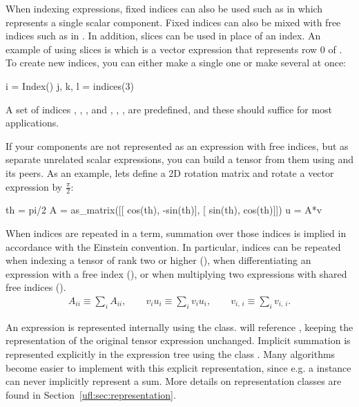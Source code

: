When indexing expressions, fixed indices can also be used such as in
 which represents a single scalar component.  Fixed
indices can also be mixed with free indices such as in .
In addition, slices can be used in place of an index.  An example of
using slices is  which is a vector expression that
represents row 0 of .  To create new indices, you can either
make a single one or make several at once:
\begin{uflcode}
i = Index()
j, k, l = indices(3)
\end{uflcode}
A set of indices , , ,  and
, , ,  are predefined,
and these should suffice for most applications.

If your components are not represented as an expression with free
indices, but as separate unrelated scalar expressions, you can build a
tensor from them using  and its peers.  As an
example, lets define a 2D rotation matrix and rotate a vector
expression by $\frac \pi 2$:
\begin{uflcode}
th = pi/2
A = as_matrix([[ cos(th), -sin(th)],
               [ sin(th),  cos(th)]])
u = A*v
\end{uflcode}

When indices are repeated in a term, summation over those indices is
implied in accordance with the Einstein convention.  In particular,
indices can be repeated when indexing a tensor of rank two or higher
(), when differentiating an expression with a free index
(), or when multiplying two expressions with shared
free indices ().
\begin{align}
A_{ii}  \equiv \sum_i A_{ii}, \qquad
v_i u_i \equiv \sum_i v_i u_i, \qquad
v_{i,\,i} \equiv \sum_i v_{i,\,i}.
\end{align}

An expression  is represented internally using the
 class.   will reference , keeping the
representation of the original tensor expression  unchanged.
Implicit summation is represented explicitly in the expression tree using
the class .  Many algorithms become easier to implement
with this explicit representation, since e.g. a  instance
can never implicitly represent a sum.  More details on representation
classes are found in Section~\ref{ufl:sec:representation}.

